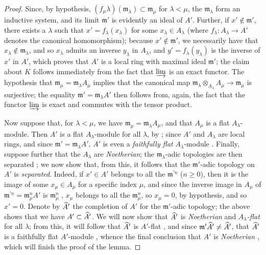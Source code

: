 \begin{proof}
\label{proof-0.10.3.1.3}
Since, by hypothesis, $(f_\mu\lambda)(\mathfrak{m}_\lambda)\subset\mathfrak{m}_\mu$ for $\lambda<\mu$, the $\mathfrak{m}_\lambda$ form an inductive system, and its limit $\mathfrak{m}'$ is evidently an ideal of $A'$.
Further, if $x'\not\in\mathfrak{m}'$, there exists a $\lambda$ such that $x'=f_\lambda(x_\lambda)$ for some $x_\lambda\in A_\lambda$ (where $f_\lambda:A_\lambda\to A'$ denotes the canonical homomorphism);
because $x'\not\in\mathfrak{m}'$, we necessarily have that $x_\lambda\not\in\mathfrak{m}_\lambda$, and so $x_\lambda$ admits an inverse $y_\lambda$ in $A_\lambda$, and $y'=f_\lambda(y_\lambda)$ is the inverse of $x'$ in $A'$, which proves that $A'$ is a local ring with maximal ideal $\mathfrak{m}'$;
the claim about $K$ follows immediately from the fact that $\varinjlim$ is an exact functor.
The hypothesis that $\mathfrak{m}_\mu=\mathfrak{m}_\lambda A_\mu$ implies that the canonical map $\mathfrak{m}_\lambda\otimes_{A_\lambda}A_\mu\to\mathfrak{m}_\mu$ is surjective;
the equality $\mathfrak{m}'=\mathfrak{m}_\lambda A'$ then follows from, again, the fact that the functor $\varinjlim$ is exact and commutes with the tensor product.

Now suppose that, for $\lambda<\mu$, we have $\mathfrak{m}_\mu=\mathfrak{m}_\lambda A_\mu$, and that $A_\mu$ is a flat $A_\lambda$-module.
Then $A'$ is a flat $A_\lambda$-module for all $\lambda$, by ;
since $A'$ and $A_\lambda$ are local rings, and since $\mathfrak{m}'=\mathfrak{m}_\lambda A'$, $A'$ is even a \emph{faithfully flat} $A_\lambda$-module .
Finally, suppose further that the $A_\lambda$ are \emph{Noetherian};
the $\mathfrak{m}_\lambda$-adic topologies are then separated ;
we now show that, from this, it follows that the $\mathfrak{m}'$-adic topology on $A'$ is \emph{separated}.
Indeed, if $x'\in A'$ belongs to all the $\mathfrak{m}^{'n}$ ($n\geq0$), then it is the image of some $x_\mu\in A_\mu$ for a specific index $\mu$, and since the inverse image in $A_\mu$ of $\mathfrak{m}^{'n}=\mathfrak{m}_\mu^n A'$ is $\mathfrak{m}_\mu^n$ , $x_\mu$ belongs to all the $\mathfrak{m}_\mu^n$, so $x_\mu=0$, by hypothesis, and so $x'=0$.
Denote by ${\widehat{A}}'$ the completion of $A'$ for the $\mathfrak{m}'$-adic topology;
the above shows that we have $A'\subset{\widehat{A}}'$.
We will now show that ${\widehat{A}}'$ is \emph{Noetherian} and \emph{$A_\lambda$-flat} for all $\lambda$;
from this,
it will follow that ${\widehat{A}}'$ is $A'$-flat , and since $\mathfrak{m}'{\widehat{A}}'\neq{\widehat{A}}'$, that ${\widehat{A}}'$ is a faithfully flat $A'$-module , whence the final conclusion that $A'$ is \emph{Noetherian} , which will finish the proof of the lemma.


\end{proof}
